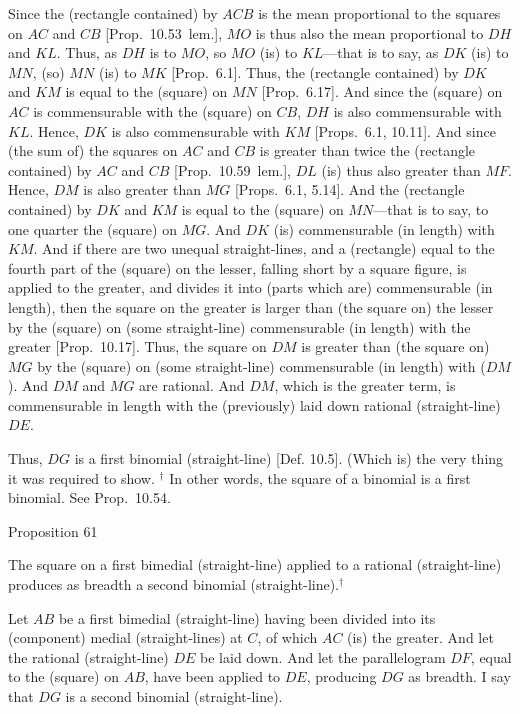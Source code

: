 Since the (rectangle contained) by $ACB$ is the mean proportional to
 the squares on $AC$ and $CB$ [Prop.~10.53~lem.], $MO$ is thus also the
mean proportional to   $DH$ and $KL$. Thus,
as $DH$ is to $MO$, so $MO$ (is) to $KL$---that is to say, as $DK$
(is) to $MN$, (so) $MN$ (is) to $MK$ [Prop.~6.1].
Thus, the (rectangle contained) by $DK$ and $KM$ is equal
to the (square) on $MN$ [Prop.~6.17]. And since
the (square) on $AC$ is commensurable with the (square) on $CB$,
$DH$ is also commensurable with $KL$. Hence, $DK$
is also commensurable with $KM$ [Props.~6.1, 10.11].
And since (the sum of) the squares on $AC$ and $CB$ is greater
than twice the (rectangle contained) by $AC$ and $CB$ [Prop.~10.59~lem.], $DL$ (is) thus also
greater than $MF$. Hence, $DM$ is also greater than $MG$
[Props.~6.1, 5.14]. And
the (rectangle contained) by $DK$ and $KM$ is equal to
the (square) on $MN$---that is to say, to one quarter the (square) on $MG$.
And $DK$ (is) commensurable (in length) with $KM$. And if there are
two unequal straight-lines, and a (rectangle) equal to the fourth part
of the (square) on the lesser, falling short by a square figure, is applied to
the greater, and divides it into (parts which are) commensurable (in length),
then the square on the greater is larger than (the square on) the lesser by
the (square) on (some straight-line) commensurable (in length) with the greater [Prop.~10.17]. Thus,  the square on $DM$
is greater than (the square on) $MG$ by the (square) on (some straight-line)
commensurable (in length) with ($DM$). And $DM$ and $MG$ are rational. And
$DM$, which is the greater term, is commensurable in length with the (previously) laid down rational (straight-line) $DE$.

Thus, $DG$ is a first binomial (straight-line) [Def. 10.5]. (Which is) the very thing it was required to show.
{\footnotesize\noindent$^\dag$ In other words, the square of a binomial  is a
first binomial. See Prop.~10.54.}


\begin{center}
{\large Proposition 61}
\end{center}

The square on a first bimedial (straight-line)
applied to a rational (straight-line) produces as breadth a second binomial
(straight-line).$^\dag$

\epsfysize=1.55in
\centerline{}

Let $AB$ be a first bimedial (straight-line) having been divided into its (component)
medial (straight-lines) at $C$, of which $AC$ (is) the greater. And let
the rational (straight-line) $DE$ be laid down. And let the parallelogram
$DF$, equal to the (square) on $AB$, have been applied to $DE$, producing
$DG$ as breadth. I say that $DG$ is a second binomial (straight-line).

